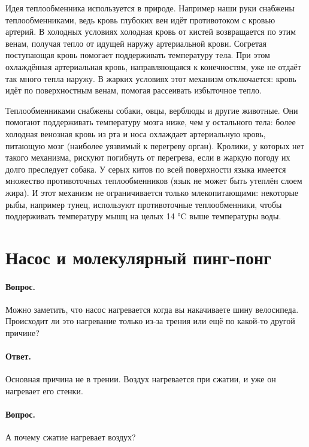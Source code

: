 Идея теплообменника используется в природе.
Например наши руки снабжены теплообменниками, ведь кровь глубоких вен идёт противотоком с кровью артерий.
В холодных условиях холодная кровь от кистей возвращается по этим венам, получая тепло от идущей наружу артериальной крови. Согретая поступающая кровь помогает поддерживать температуру тела.
При этом охлаждённая артериальная кровь, направляющаяся к конечностям, уже не отдаёт так много тепла наружу.
В жарких условиях этот механизм отключается: кровь идёт по поверхностным венам, помогая рассеивать избыточное тепло.

Теплообменниками снабжены собаки, овцы, верблюды и другие животные.
Они помогают поддерживать температуру мозга ниже, чем у остального тела: более холодная венозная кровь из рта и носа охлаждает артериальную кровь, питающую мозг (наиболее уязвимый к перегреву орган).
Кролики, у которых нет такого механизма, рискуют погибнуть от перегрева, если в жаркую погоду их долго преследует собака.
У серых китов по всей поверхности языка имеется множество противоточных теплообменников (язык не может быть утеплён слоем жира).
И этот механизм не ограничивается только млекопитающими: некоторые рыбы, например тунец, используют противоточные теплообменники, чтобы поддерживать температуру мышц на целых 14 °C выше температуры воды.

\section{Насос и молекулярный пинг-понг}\label{Насос и молекулярный пинг-понг}

\paragraph{Вопрос.}
Можно заметить, что насос нагревается когда вы накачиваете шину велосипеда.
Происходит ли это нагревание только из-за трения или ещё по какой-то другой причине?

\paragraph{Ответ.}
Основная причина не в трении.
Воздух нагревается при сжатии, и уже он нагревает его стенки.

\paragraph{Вопрос.} А почему сжатие нагревает воздух?

